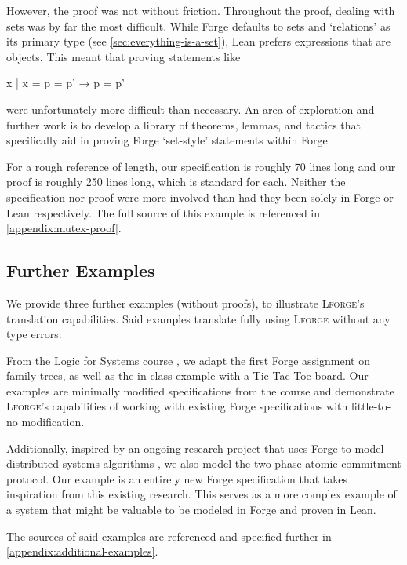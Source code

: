 However, the proof was not without friction. Throughout the proof, dealing with sets was by far the most difficult. While Forge defaults to sets and `relations' as its primary type (see \cref{sec:everything-is-a-set}), Lean prefers expressions that are objects. This meant that proving statements like 
\begin{lean*}
{ x | x = p } = { p' } → p = p'
\end{lean*}
were unfortunately more difficult than necessary. An area of exploration and further work is to develop a library of theorems, lemmas, and tactics that specifically aid in proving Forge `set-style' statements within Forge. 

For a rough reference of length, our specification is roughly 70 lines long and our proof is roughly 250 lines long, which is standard for each. Neither the specification nor proof were more involved than had they been solely in Forge or Lean respectively. The full source of this example is referenced in \cref{appendix:mutex-proof}. 

\subsection{Further Examples}
We provide three further examples (without proofs), to illustrate \textsc{Lforge}'s translation capabilities. Said examples translate fully using \textsc{Lforge} without any type errors. 

From the Logic for Systems course \cite{l4s}, we adapt the first Forge assignment on family trees, as well as the in-class example with a Tic-Tac-Toe board. Our examples are minimally modified specifications from the course and demonstrate \textsc{Lforge}'s capabilities of working with existing Forge specifications with little-to-no modification. 

Additionally, inspired by an ongoing research project that uses Forge to model distributed systems algorithms \cite{distributedforge}, we also model the two-phase atomic commitment protocol. Our example is an entirely new Forge specification that takes inspiration from this existing research. This serves as a more complex example of a system that might be valuable to be modeled in Forge and proven in Lean. 

The sources of said examples are referenced and specified further in \cref{appendix:additional-examples}. 